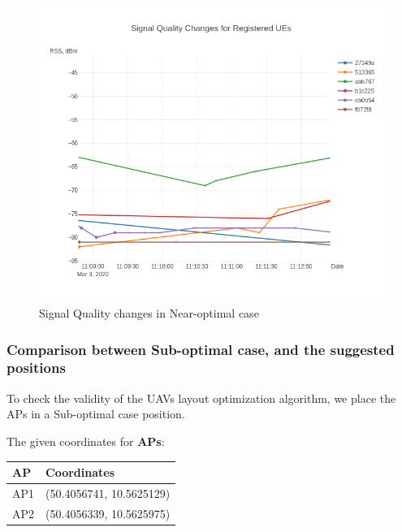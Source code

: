 \begin{figure}[H]
	\centering
	\includegraphics[width=\linewidth,keepaspectratio]{images/Exp4_Near_Optimal.png}
\caption{Signal Quality changes in Near-optimal case}
\end{figure}

\subsubsection{Comparison between Sub-optimal case, and the suggested
positions}

To check the validity of the UAVs layout optimization algorithm, we
place the APs in a Sub-optimal case position.

The given coordinates for \textbf{APs}:

\begin{longtable}[]{@{}ll@{}}
\toprule
AP & Coordinates\tabularnewline
\midrule
\endhead
AP1 & (50.4056741, 10.5625129)\tabularnewline
AP2 & (50.4056339, 10.5625975)\tabularnewline
\bottomrule
\end{longtable}

